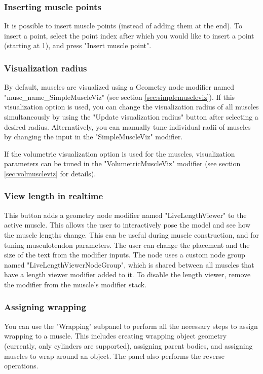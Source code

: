 \documentclass{article}
\begin{document}
\subsubsection{Inserting muscle points}
It is possible to insert muscle points (instead of adding them at the end). To insert a point, select the point index after which you would like to insert a point (starting at 1), and press "Insert muscle point".


\subsubsection{Visualization radius}
By default, muscles are visualized using a Geometry node modifier named "musc\_name\_SimpleMuscleViz" (see section \ref{sec:simplemuscleviz}). If this visualization option is used, you can change the visualization radius of all muscles simultaneously by using the "Update visualization radius" button after selecting a desired radius. Alternatively, you can manually tune individual radii of muscles by changing the input in the "SimpleMuscleViz" modifier.

If the volumetric visualization option is used for the muscles, visualization parameters can be tuned in the "VolumetricMuscleViz" modifier (see section \ref{sec:volmuscleviz} for details).

\subsubsection{View length in realtime}

This button adds a geometry node modifier named "LiveLengthViewer" to the active muscle. This allows the user to interactively pose the model and see how the muscle lengths change. This can be useful during muscle construction, and for tuning musculotendon parameters. The user can change the placement and the size of the text from the modifier inputs. %
The node uses a custom node group named "LiveLengthViewerNodeGroup", which is shared between all muscles that have a length viewer modifier added to it. To disable the length viewer, remove the modifier from the muscle's modifier stack.


\subsubsection{Assigning wrapping}

You can use the "Wrapping" subpanel to perform all the necessary steps to assign wrapping to a muscle. This includes creating wrapping object geometry (currently, only cylinders are supported), assigning parent bodies, and assigning muscles to wrap around an object. The panel also performs the reverse operations. 
\end{document}
